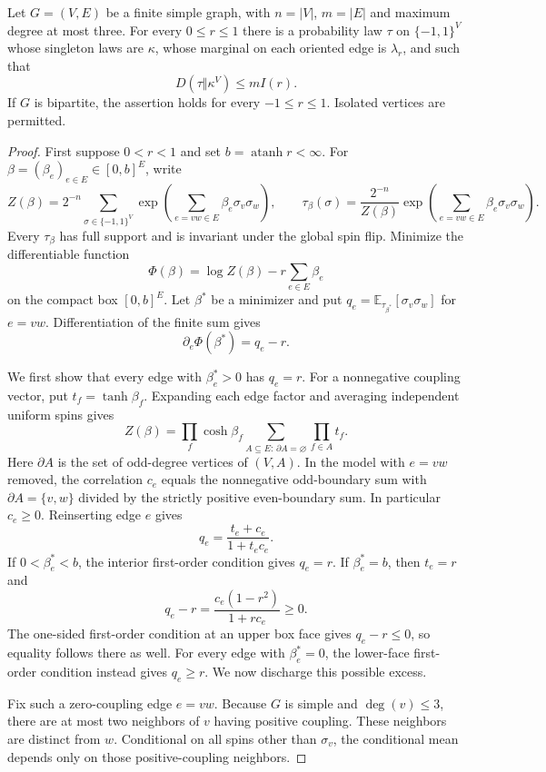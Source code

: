 \begin{proposition}
\label{prop:binary-subcubic-exact-fitting}
Let $G=(V,E)$ be a finite simple graph, with $n=|V|$, $m=|E|$ and
maximum degree at most three.  For every $0\leq r\leq1$ there is a
probability law $\tau$ on $\{-1,1\}^{V}$ whose singleton laws are
$\kappa$, whose marginal on each oriented edge is $\lambda_r$, and
such that
\[
 D(\tau\Vert\kappa^{V})\leq mI(r).
\]
If $G$ is bipartite, the assertion holds for every $-1\leq r\leq1$.
Isolated vertices are permitted.
\end{proposition}

\begin{proof}
First suppose $0<r<1$ and set $b=\operatorname{atanh}r<\infty$.
For $\beta=(\beta_e)_{e\in E}\in[0,b]^E$, write
\[
 Z(\beta)=2^{-n}\sum_{\sigma\in\{-1,1\}^{V}}
       \exp\left(\sum_{e=vw\in E}\beta_e\sigma_v\sigma_w\right),
 \qquad
 \tau_\beta(\sigma)=\frac{2^{-n}}{Z(\beta)}
       \exp\left(\sum_{e=vw\in E}\beta_e\sigma_v\sigma_w\right).
\]
Every $\tau_\beta$ has full support and is invariant under the global
spin flip.  Minimize the differentiable function
\[
 \Phi(\beta)=\log Z(\beta)-r\sum_{e\in E}\beta_e
\]
on the compact box $[0,b]^E$.  Let $\beta^*$ be a minimizer and put
$q_e=\mathbb E_{\tau_{\beta^*}}[\sigma_v\sigma_w]$ for $e=vw$.
Differentiation of the finite sum gives
\[
 \partial_e\Phi(\beta^*)=q_e-r.
\]

We first show that every edge with $\beta_e^*>0$ has $q_e=r$.
For a nonnegative coupling vector, put $t_f=\tanh\beta_f$.
Expanding each edge factor and averaging independent uniform spins gives
\[
 Z(\beta)=\prod_f\cosh\beta_f
   \sum_{A\subseteq E:\,\partial A=\varnothing}\prod_{f\in A}t_f.
\]
Here $\partial A$ is the set of odd-degree vertices of $(V,A)$.
In the model with $e=vw$ removed, the correlation $c_e$ equals the
nonnegative odd-boundary sum with $\partial A=\{v,w\}$ divided by
the strictly positive even-boundary sum.  In particular $c_e\geq0$.
Reinserting edge $e$ gives
\[
 q_e=\frac{t_e+c_e}{1+t_ec_e}.
\]
If $0<\beta_e^*<b$, the interior first-order condition gives $q_e=r$.
If $\beta_e^*=b$, then $t_e=r$ and
\[
 q_e-r=\frac{c_e(1-r^2)}{1+rc_e}\geq0.
\]
The one-sided first-order condition at an upper box face gives
$q_e-r\leq0$, so equality follows there as well.
For every edge with $\beta_e^*=0$, the lower-face first-order condition
instead gives $q_e\geq r$.  We now discharge this possible excess.

Fix such a zero-coupling edge $e=vw$.
Because $G$ is simple and $\deg(v)\leq3$, there are at most two
neighbors of $v$ having positive coupling.  These neighbors are
distinct from $w$.  Conditional on all spins other than $\sigma_v$,
the conditional mean depends only on those positive-coupling neighbors.


\end{proof}
